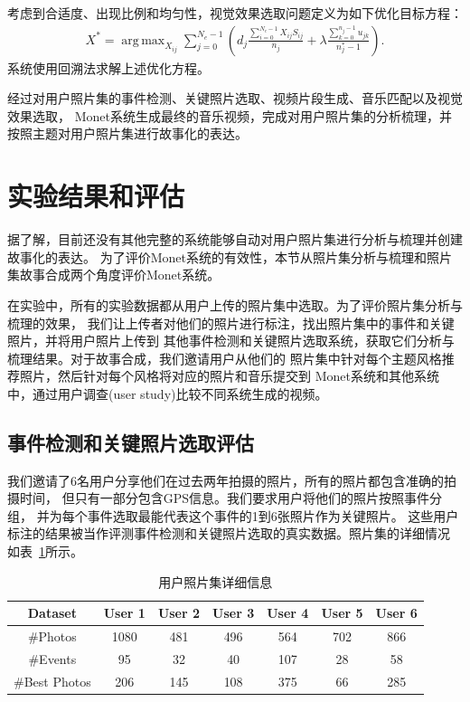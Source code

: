 \documentclass[doctor]{ustcthesis}
\DeclareMathOperator*{\argmax}{arg\,max}
\begin{document}
考虑到合适度、出现比例和均匀性，视觉效果选取问题定义为如下优化目标方程：
\begin{eqnarray}
    X^* = \argmax_{X_{ij}}
    \sum_{j=0}^{N_e-1}(d_j\frac{\sum_{i=0}^{N_c-1}X_{ij}S_{ij}}{n_j}
    + \lambda \frac{\sum_{k=0}^{n_j-1}u_{jk}}{n_j^*-1}).
\end{eqnarray}
系统使用回溯法求解上述优化方程。

经过对用户照片集的事件检测、关键照片选取、视频片段生成、音乐匹配以及视觉效果选取，
Monet系统生成最终的音乐视频，完成对用户照片集的分析梳理，并按照主题对用户照片集进行故事化的表达。

\section{实验结果和评估}
据了解，目前还没有其他完整的系统能够自动对用户照片集进行分析与梳理并创建故事化的表达。
为了评价Monet系统的有效性，本节从照片集分析与梳理和照片集故事合成两个角度评价Monet系统。

在实验中，所有的实验数据都从用户上传的照片集中选取。为了评价照片集分析与梳理的效果，
我们让上传者对他们的照片进行标注，找出照片集中的事件和关键照片，并将用户照片上传到
其他事件检测和关键照片选取系统，获取它们分析与梳理结果。对于故事合成，我们邀请用户从他们的
照片集中针对每个主题风格推荐照片，然后针对每个风格将对应的照片和音乐提交到
Monet系统和其他系统中，通过用户调查(user study)比较不同系统生成的视频。

\subsection{事件检测和关键照片选取评估}
我们邀请了6名用户分享他们在过去两年拍摄的照片，所有的照片都包含准确的拍摄时间，
但只有一部分包含GPS信息。我们要求用户将他们的照片按照事件分组，
并为每个事件选取最能代表这个事件的1到6张照片作为关键照片。
这些用户标注的结果被当作评测事件检测和关键照片选取的真实数据。照片集的详细情况
如表~\ref{tab:monet-photos-info}所示。
\begin{table}[t]
    \centering
    \caption{用户照片集详细信息} \label{tab:monet-photos-info}
    \begin{tabular}{|c|c|c|c|c|c|c|}
        \hline
        Dataset & User 1 & User 2 & User 3 &  User 4 &User 5 & User 6\\ \hline
        \#Photos & 1080 & 481 & 496 &  564 & 702 & 866 \\ \hline
        \#Events & 95 & 32 & 40 &  107 & 28 & 58 \\ \hline
        \#Best Photos & 206 & 145 & 108 &  375 & 66 & 285 \\ \hline
    \end{tabular}
\end{table}
\end{document}
